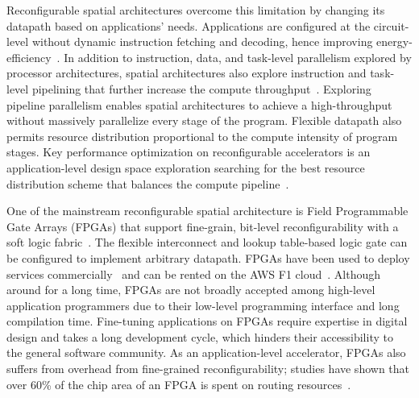 Reconfigurable spatial architectures overcome this limitation by changing its datapath based on applications' needs.
Applications are configured at the circuit-level without dynamic instruction fetching and decoding,
hence improving energy-efficiency~\cite{calhoun,fpgaPower}.
In addition to instruction, data, and task-level parallelism explored by processor architectures, spatial architectures also explore instruction and task-level
pipelining that further increase the compute throughput~\cite{spatial-computation}.
Exploring pipeline parallelism enables spatial architectures to achieve a high-throughput
without massively parallelize every stage of the program.
Flexible datapath also permits resource distribution proportional to the compute intensity of
program stages.
Key performance optimization on reconfigurable accelerators is an application-level design space
exploration 
searching for the best resource distribution scheme that balances the compute pipeline~\cite{dse_koeplinger}.

One of the mainstream reconfigurable spatial architecture is 
Field Programmable Gate Arrays (FPGAs) that support fine-grain, 
bit-level reconfigurability with a soft logic fabric~\cite{fpga-survey}.
The flexible interconnect and lookup table-based logic gate can be configured to implement arbitrary
datapath.
FPGAs have been used to deploy services commercially~\cite{microsoft, baidu, deephi} and can be rented on the AWS F1 cloud~\cite{aws}. 
Although around for a long time, FPGAs are not broadly accepted among high-level application programmers due to their low-level programming interface and long compilation time.
Fine-tuning applications on FPGAs require expertise in digital design and takes a long
development cycle, which hinders their accessibility to the general software community.
As an application-level accelerator, FPGAs also suffers from overhead from fine-grained reconfigurability; 
studies have shown that over 60\% of the chip area of an FPGA is spent on routing resources~\cite{fpgaSurvey, calhoun, fpgaPower}. 


